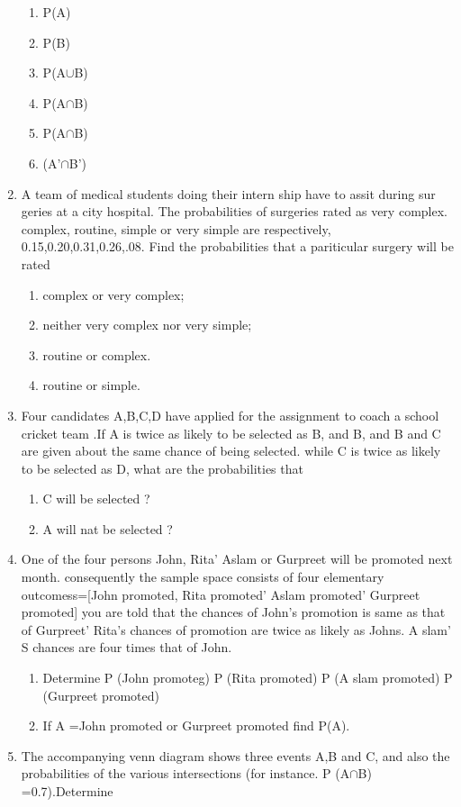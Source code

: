 \documentclass[12pt]{article}
\begin{document}
\begin{enumerate}
\begin{enumerate}
\item P(A)
\item P(B)
\item P(A$\cup$B)
\item P(A$\cap$B)
\item P(A$\cap$B)
\item (A'$\cap$B')
\end{enumerate}
\item A team of medical students doing their intern ship have to assit during sur geries at a city hospital. The probabilities of surgeries rated as very complex. complex, routine, simple or very simple are respectively, 0.15,0.20,0.31,0.26,.08. Find the probabilities that a pariticular surgery will be rated
\begin{enumerate}
\item complex or very complex;
\item neither very complex nor very simple;
\item routine or complex. 
\item routine or simple.
\end{enumerate}
\item Four candidates A,B,C,D have applied for the assignment to coach a school cricket team .If A is twice as likely to be selected as B, and B, and B and C are given about the same chance of being selected. while C is twice as likely to be selected as D, what are the probabilities that
\begin{enumerate}
\item C will be selected ?
\item A will nat be selected ?
\end{enumerate}
\item One of the four persons John, Rita' Aslam or Gurpreet will be promoted next month. consequently the sample space consists of four elementary outcomess=[John promoted, Rita promoted' Aslam promoted' Gurpreet promoted] you are told that the chances of John's promotion is same as that of Gurpreet' Rita's chances of promotion are twice as likely as Johns. A slam' S chances are four times that of John.
\begin{enumerate}
\item Determine P (John promoteg)
  P (Rita promoted)
P (A slam promoted)
P (Gurpreet promoted)
\item If A ={John promoted or Gurpreet promoted} find P(A).
\end{enumerate}
\item The accompanying venn diagram shows three events A,B and C, and also the probabilities of the various intersections (for instance. P (A$\cap$B) =0.7).Determine

\end{enumerate}
\end{document}
